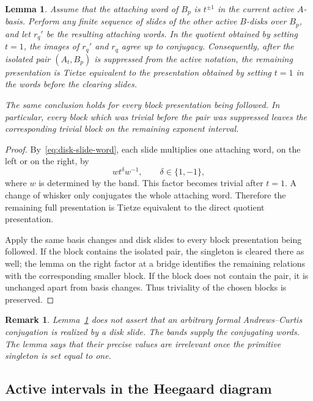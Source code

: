 \documentclass{article}
\newtheorem{lm}[theorem]{Lemma}
\newtheorem{remark}[theorem]{Remark}
\begin{document}
\begin{lm}
\label{lem:pivot-contraction}
Assume that the attaching word of $B_p$ is $t^{\pm1}$ in the current active
$A$-basis.  Perform any finite sequence of slides of the other active
$B$-disks over $B_p$, and let $r_q'$ be the resulting attaching words.  In
the quotient obtained by setting $t=1$, the images of $r_q'$ and $r_q$
agree up to conjugacy.  Consequently, after the isolated pair
$(A_t,B_p)$ is suppressed from the active notation, the remaining
presentation is Tietze equivalent to the presentation obtained by setting
$t=1$ in the words before the clearing slides.

The same conclusion holds for every block presentation being followed.  In
particular, every block which was trivial before the pair was suppressed
leaves the corresponding trivial block on the remaining exponent interval.
\end{lm}

\begin{proof}
By~\eqref{eq:disk-slide-word}, each slide multiplies one attaching word, on
the left or on the right, by
\[
 w t^{\delta}w^{-1},
 \qquad \delta\in\{1,-1\},
\]
where $w$ is determined by the band.  This factor becomes trivial after
$t=1$.  A change of whisker only conjugates the whole attaching word.
Therefore the remaining full presentation is Tietze equivalent to the
direct quotient presentation.

Apply the same basis changes and disk slides to every block presentation
being followed.  If the block contains the isolated pair, the singleton is
cleared there as well; the lemma on the right factor at a bridge identifies
the remaining relations with the corresponding smaller block.  If the block
does not contain the pair, it is unchanged apart from basis changes.  Thus
triviality of the chosen blocks is preserved.
\end{proof}

\begin{remark}
Lemma~\ref{lem:pivot-contraction} does not assert that an arbitrary formal
Andrews--Curtis conjugation is realized by a disk slide.  The bands supply the
conjugating words.  The lemma says that their precise values are irrelevant
once the primitive singleton is set equal to one.
\end{remark}

\subsection{Active intervals in the Heegaard diagram}
\end{document}
